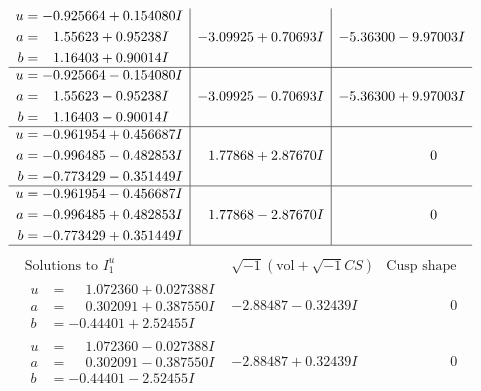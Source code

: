 \documentclass[1p]{elsarticle_modified}
\theoremstyle{definition}
\newcommand{\I}{\sqrt{-1}}
\begin{document}
$$\begin{array}{c|c|c}
\begin{aligned}
u &= -0.925664 + 0.154080 I \\
a &= \phantom{-}1.55623 + 0.95238 I \\
b &= \phantom{-}1.16403 + 0.90014 I\end{aligned}
 & -3.09925 + 0.70693 I & -5.36300 - 9.97003 I \\ \hline\begin{aligned}
u &= -0.925664 - 0.154080 I \\
a &= \phantom{-}1.55623 - 0.95238 I \\
b &= \phantom{-}1.16403 - 0.90014 I\end{aligned}
 & -3.09925 - 0.70693 I & -5.36300 + 9.97003 I \\ \hline\begin{aligned}
u &= -0.961954 + 0.456687 I \\
a &= -0.996485 - 0.482853 I \\
b &= -0.773429 - 0.351449 I\end{aligned}
 & \phantom{-}1.77868 + 2.87670 I & \phantom{-0.000000 } 0 \\ \hline\begin{aligned}
u &= -0.961954 - 0.456687 I \\
a &= -0.996485 + 0.482853 I \\
b &= -0.773429 + 0.351449 I\end{aligned}
 & \phantom{-}1.77868 - 2.87670 I & \phantom{-0.000000 } 0\\
 \hline 
 \end{array}$$\newpage$$\begin{array}{c|c|c}  
\text{Solutions to }I^u_{1}& \I (\text{vol} + \sqrt{-1}CS) & \text{Cusp shape}\\
 \hline 
\begin{aligned}
u &= \phantom{-}1.072360 + 0.027388 I \\
a &= \phantom{-}0.302091 + 0.387550 I \\
b &= -0.44401 + 2.52455 I\end{aligned}
 & -2.88487 - 0.32439 I & \phantom{-0.000000 } 0 \\ \hline\begin{aligned}
u &= \phantom{-}1.072360 - 0.027388 I \\
a &= \phantom{-}0.302091 - 0.387550 I \\
b &= -0.44401 - 2.52455 I\end{aligned}
 & -2.88487 + 0.32439 I & \phantom{-0.000000 } 0 \\ \hline\begin{aligned}

\end{aligned}
\end{array}$$
\end{document}
